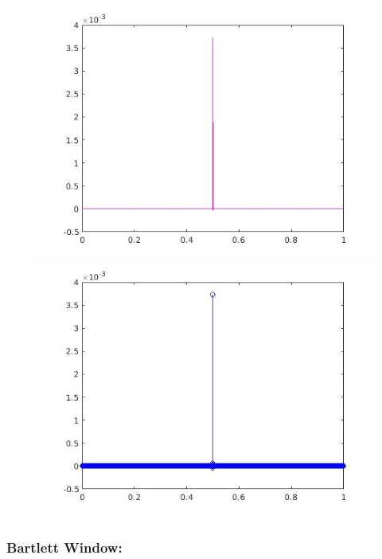 \documentclass[a4paper,11pt]{article}
\begin{document}
\begin{figure}[!hp]
\centering
\begin{minipage}{.5\textwidth}
  \centering
  \includegraphics[width=1\linewidth]{images/lab2_73.jpg}
\end{minipage}%
\begin{minipage}{.5\textwidth}
  \centering
  \includegraphics[width=1\linewidth]{images/lab2_74.jpg}
\end{minipage}
\end{figure}

\newpage

\subsubsection{Bartlett Window:}
\end{document}
